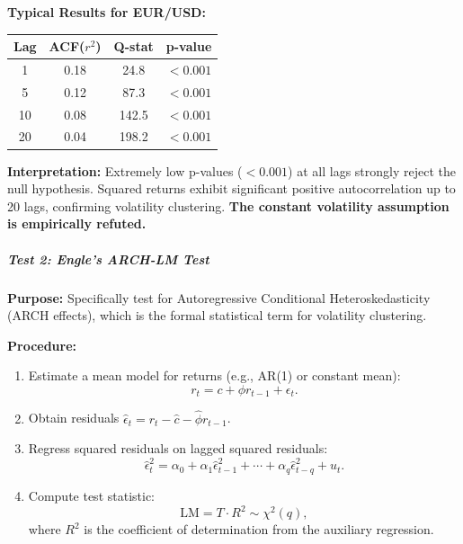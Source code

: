 \textbf{Typical Results for EUR/USD:}

\begin{center}
	\begin{tabular}{|c|c|c|c|}
		\hline
		\textbf{Lag} & \textbf{ACF($r^2$)} & \textbf{Q-stat} & \textbf{p-value} \\
		\hline
		1 & 0.18 & 24.8 & $<0.001$ \\
		5 & 0.12 & 87.3 & $<0.001$ \\
		10 & 0.08 & 142.5 & $<0.001$ \\
		20 & 0.04 & 198.2 & $<0.001$ \\
		\hline
	\end{tabular}
\end{center}

\textbf{Interpretation:} Extremely low p-values ($< 0.001$) at all lags strongly reject the null hypothesis. Squared returns exhibit significant positive autocorrelation up to 20 lags, confirming volatility clustering. \textbf{The constant volatility assumption is empirically refuted.}

\subparagraph{Test 2: Engle's ARCH-LM Test}

\textbf{Purpose:} Specifically test for Autoregressive Conditional Heteroskedasticity (ARCH effects), which is the formal statistical term for volatility clustering.

\textbf{Procedure:}

\begin{enumerate}
	\item Estimate a mean model for returns (e.g., AR(1) or constant mean):
	\begin{equation}
		r_t = c + \phi r_{t-1} + \epsilon_t.
	\end{equation}
	
	\item Obtain residuals $\hat{\epsilon}_t = r_t - \hat{c} - \hat{\phi} r_{t-1}$.
	
	\item Regress squared residuals on lagged squared residuals:
	\begin{equation}
		\hat{\epsilon}_t^2 = \alpha_0 + \alpha_1 \hat{\epsilon}_{t-1}^2 + \cdots + \alpha_q \hat{\epsilon}_{t-q}^2 + u_t.
	\end{equation}
	
	\item Compute test statistic:
	\begin{equation}
		\text{LM} = T \cdot R^2 \sim \chi^2(q),
	\end{equation}
	where $R^2$ is the coefficient of determination from the auxiliary regression.
\end{enumerate}

